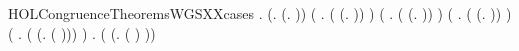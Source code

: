 \begin{SaveVerbatim}{HOLCongruenceTheoremsWGSXXcases}
\HOLTokenTurnstile{} \HOLSymConst{\HOLTokenForall{}}.
         \HOLSymConst{\HOLTokenEquiv{}}
       (\HOLSymConst{\HOLTokenExists{}}.  \HOLSymConst{=} (\HOLTokenLambda{}. )) \HOLSymConst{\HOLTokenDisj{}}
       (\HOLSymConst{\HOLTokenExists{}} . ( \HOLSymConst{=} (\HOLTokenLambda{}.  )) \HOLSymConst{\HOLTokenConj{}}  ) \HOLSymConst{\HOLTokenDisj{}}
       (\HOLSymConst{\HOLTokenExists{}}   .
            ( \HOLSymConst{=} (\HOLTokenLambda{}.   \HOLSymConst{\ensuremath{+}}  )) \HOLSymConst{\HOLTokenConj{}}   \HOLSymConst{\HOLTokenConj{}}
             ) \HOLSymConst{\HOLTokenDisj{}}
       (\HOLSymConst{\HOLTokenExists{}} . ( \HOLSymConst{=} (\HOLTokenLambda{}.   \HOLSymConst{\ensuremath{\parallel}}  )) \HOLSymConst{\HOLTokenConj{}}   \HOLSymConst{\HOLTokenConj{}}  ) \HOLSymConst{\HOLTokenDisj{}}
       (\HOLSymConst{\HOLTokenExists{}} . ( \HOLSymConst{=} (\HOLTokenLambda{}. \HOLConst{\ensuremath{\nu}}  ( ))) \HOLSymConst{\HOLTokenConj{}}  ) \HOLSymConst{\HOLTokenDisj{}}
       \HOLSymConst{\HOLTokenExists{}} . ( \HOLSymConst{=} (\HOLTokenLambda{}.  ( ) )) \HOLSymConst{\HOLTokenConj{}}  
\end{SaveVerbatim}
